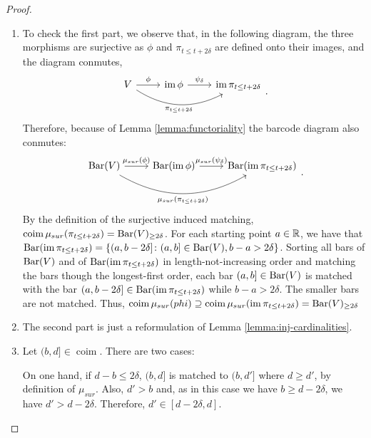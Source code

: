 \begin{proof}
\begin{enumerate}
    \item
    To check the first part, we observe that, in the following diagram, the three morphisms are surjective as $\phi$ and $\pi_{t \leq t+2\delta}$ are defined onto their images, and the diagram conmutes,
    $$
    \begin{tikzcd}
        V \arrow[r, "\phi"] \arrow[rr, "\pi_{t \leq t+2\delta}"', bend right] 
        & \im \phi \arrow[r, "\psi_\delta"] 
        & \im \pi_{t \leq t+2\delta} \\
    \end{tikzcd}.
    $$
    Therefore, because of Lemma \ref{lemma:functoriality} the barcode diagram also conmutes:
    $$
    \begin{tikzcd}
        \barc(V) \arrow[r, "\mu_{sur}(\phi)"] \arrow[rr, "\mu_{sur}(\pi_{t \leq t+2\delta})"', bend right] 
        & \barc(\im \phi) \arrow[r, "\mu_{sur}({\psi_\delta})"] 
        & \barc(\im \pi_{t \leq t+2\delta}) \\
    \end{tikzcd}.
    $$
    By the definition of the surjective induced matching, $ \operatorname{coim} \mu_{sur}(\pi_{t \leq t+2\delta}) = \operatorname{Bar}(V)_{\geq 2\delta}$. For each starting point $ a \in \mathbb R $, we have that $\operatorname{Bar}(\operatorname{im} \pi_{t \leq t+2\delta}) = \{ (a, b-2\delta] \colon (a, b]\in \operatorname{Bar}(V), b-a > 2\delta\}$. Sorting all bars of $\operatorname{Bar}(V) $ and of $\operatorname{Bar}(\operatorname{im} \pi_{t \leq t+2\delta}) $ in length-not-increasing order and matching the bars though the longest-first order, each bar $ (a, b] \in \operatorname{Bar}(V) $ is matched with the bar $ (a, b - 2\delta] \in \operatorname{Bar}(\operatorname{im} \pi_{t \leq t+2\delta}) $ while $ b -a >2 \delta $. The smaller bars are not matched. Thus, $\operatorname{coim} \mu_{sur}(phi) \supseteq \operatorname{coim} \mu_{sur}(\operatorname{im} \pi_{t \leq t+2\delta}) = \operatorname{Bar} (V)_{\geq 2\delta} $

    \item
    The second part is just a reformulation of Lemma \ref{lemma:inj-cardinalities}.

    \item
    Let $ (b,d] \in \operatorname{coim} $. There are two cases:

    On one hand, if $ d - b \leq 2 \delta $, $(b, d]$ is matched to $ (b, d'] $ where $ d \geq d'$, by definition of $ \mu_{sur} $. Also, $ d' > b $ and, as in this case we have $ b \geq d - 2 \delta $, we have $ d' > d - 2 \delta $. Therefore, $ d' \in [d - 2 \delta, d]$.


\end{enumerate}
\end{proof}
